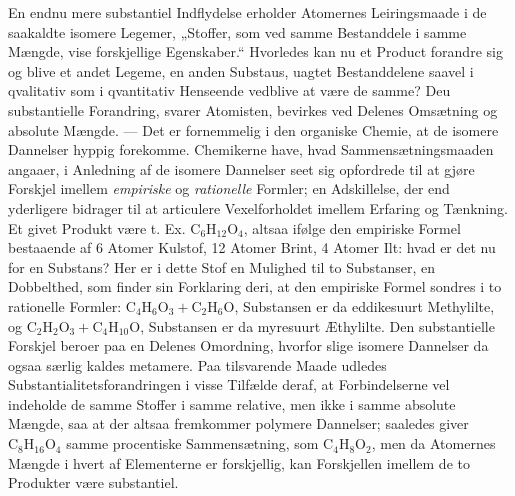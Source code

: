 \documentclass[12pt,a4paper]{book}
\begin{document}
En endnu mere substantiel Indflydelse erholder Atomernes
Leiringsmaade i de saakaldte isomere Legemer, „Stoffer, som
ved samme Bestanddele i samme Mængde, vise forskjellige
Egenskaber.“ Hvorledes kan nu et Product forandre sig og
blive et andet Legeme, en anden Substaus, uagtet
Bestanddelene saavel i qvalitativ som i qvantitativ Henseende
vedblive at være de samme? Deu substantielle
Forandring, svarer Atomisten, bevirkes ved Delenes Omsætning
og absolute Mængde. --- Det er fornemmelig i den organiske
Chemie, at de isomere Dannelser hyppig forekomme.
Chemikerne have, hvad Sammensætningsmaaden angaaer, i
Anledning af de isomere Dannelser seet sig opfordrede til at gjøre
Forskjel imellem \emph{empiriske} og \emph{rationelle} Formler; en
Adskillelse, der end yderligere bidrager til at articulere
Vexelforholdet imellem Erfaring og Tænkning. Et givet Produkt
være t. Ex. $\mathrm{C}_6\mathrm{H}_{12}\mathrm{O}_4$, altsaa ifølge den empiriske Formel
bestaaende af 6 Atomer Kulstof, 12 Atomer Brint, 4 Atomer
\setcounter{footnote}{0}
Ilt: hvad er det nu for en Substans? Her er i dette Stof
en Mulighed til to Substanser, en Dobbelthed, som finder
sin Forklaring deri, at den empiriske Formel sondres i to
rationelle Formler: $\mathrm{C}_4\mathrm{H}_6\mathrm{O}_3 + \mathrm{C}_2\mathrm{H}_6\mathrm{O}$, Substansen er da
eddikesuurt Methylilte, og $\mathrm{C}_2\mathrm{H}_2\mathrm{O}_3 + \mathrm{C}_4\mathrm{H}_{10}\mathrm{O}$, Substansen er
da myresuurt Æthylilte. Den substantielle Forskjel beroer
paa en Delenes Omordning, hvorfor slige isomere Dannelser
da ogsaa særlig kaldes metamere. Paa tilsvarende Maade
udledes Substantialitetsforandringen i visse Tilfælde deraf,
at Forbindelserne vel indeholde de samme Stoffer i samme
relative, men ikke i samme absolute Mængde, saa at der
altsaa fremkommer polymere Dannelser; saaledes giver $\mathrm{C}_8\mathrm{H}_{16}\mathrm{O}_4$
samme procentiske Sammensætning, som $\mathrm{C}_4\mathrm{H}_8\mathrm{O}_2$, men da
Atomernes Mængde i hvert af Elementerne er forskjellig, kan
Forskjellen imellem de to Produkter være substantiel.
\end{document}
